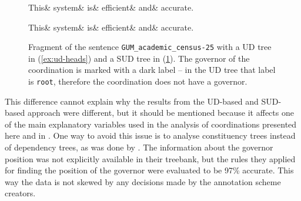 \begin{figure}[H]
\begin{exe}
\ex\label{ex:ud-heads}
\begin{dependency}[baseline=-\the\dimexpr\fontdimen22\textfont2\relax]
	\begin{deptext}[column sep=.4cm]
			This\& system\& is\& efficient\& and\& accurate.\\
		\end{deptext} 
\end{dependency}
\end{exe}

\begin{exe}
\ex\label{ex:sud-heads}
\begin{dependency}[baseline=-\the\dimexpr\fontdimen22\textfont2\relax]
	\begin{deptext}[column sep=.4cm]
			This\& system\& is\& efficient\& and\& accurate.\\
		\end{deptext} 
\end{dependency}
\end{exe}
\caption{Fragment of the sentence \texttt{GUM\_academic\_census-25} with a UD tree in (\ref{ex:ud-heads}) and a SUD tree in (\ref{ex:sud-heads}). The governor of the coordination is marked with a dark label -- in the UD tree that label is \texttt{root}, therefore the coordination does not have a governor.}
\end{figure}

This difference cannot explain why the results from the UD-based and SUD-based approach were different, but it should be mentioned because it affects one of the main explanatory variables used in the analysis of coordinations presented here and in \cite{prz:etal:24}. One way to avoid this issue is to analyse constituency trees instead of dependency trees, as was done by \cite{prz:woz:23}. The information about the governor position was not explicitly available in their treebank, but the rules they applied for finding the position of the governor were evaluated to be 97\% accurate. This way the data is not skewed by any decisions made by the annotation scheme creators. 

